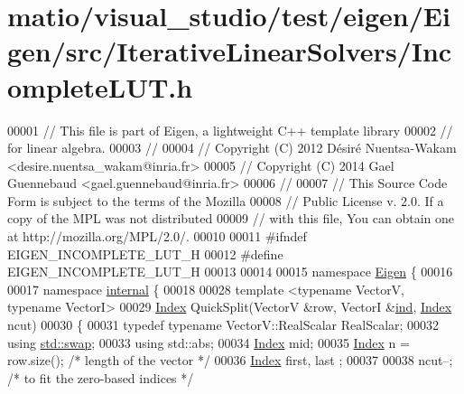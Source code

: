 \hypertarget{matio_2visual__studio_2test_2eigen_2_eigen_2src_2_iterative_linear_solvers_2_incomplete_l_u_t_8h_source}{}\section{matio/visual\+\_\+studio/test/eigen/\+Eigen/src/\+Iterative\+Linear\+Solvers/\+Incomplete\+L\+UT.h}
\label{matio_2visual__studio_2test_2eigen_2_eigen_2src_2_iterative_linear_solvers_2_incomplete_l_u_t_8h_source}

\begin{DoxyCode}
00001 \textcolor{comment}{// This file is part of Eigen, a lightweight C++ template library}
00002 \textcolor{comment}{// for linear algebra.}
00003 \textcolor{comment}{//}
00004 \textcolor{comment}{// Copyright (C) 2012 Désiré Nuentsa-Wakam <desire.nuentsa\_wakam@inria.fr>}
00005 \textcolor{comment}{// Copyright (C) 2014 Gael Guennebaud <gael.guennebaud@inria.fr>}
00006 \textcolor{comment}{//}
00007 \textcolor{comment}{// This Source Code Form is subject to the terms of the Mozilla}
00008 \textcolor{comment}{// Public License v. 2.0. If a copy of the MPL was not distributed}
00009 \textcolor{comment}{// with this file, You can obtain one at http://mozilla.org/MPL/2.0/.}
00010 
00011 \textcolor{preprocessor}{#ifndef EIGEN\_INCOMPLETE\_LUT\_H}
00012 \textcolor{preprocessor}{#define EIGEN\_INCOMPLETE\_LUT\_H}
00013 
00014 
00015 \textcolor{keyword}{namespace }\hyperlink{namespace_eigen}{Eigen} \{ 
00016 
00017 \textcolor{keyword}{namespace }\hyperlink{namespaceinternal}{internal} \{
00018     
00028 \textcolor{keyword}{template} <\textcolor{keyword}{typename} VectorV, \textcolor{keyword}{typename} VectorI>
00029 \hyperlink{namespace_eigen_a62e77e0933482dafde8fe197d9a2cfde}{Index} QuickSplit(VectorV &row, VectorI &\hyperlink{structind}{ind}, \hyperlink{namespace_eigen_a62e77e0933482dafde8fe197d9a2cfde}{Index} ncut)
00030 \{
00031   \textcolor{keyword}{typedef} \textcolor{keyword}{typename} VectorV::RealScalar RealScalar;
00032   \textcolor{keyword}{using} \hyperlink{endian_8c_a3ca5ecd34b04d6a243c054ac3a57f68d}{std::swap};
00033   \textcolor{keyword}{using} std::abs;
00034   \hyperlink{namespace_eigen_a62e77e0933482dafde8fe197d9a2cfde}{Index} mid;
00035   \hyperlink{namespace_eigen_a62e77e0933482dafde8fe197d9a2cfde}{Index} n = row.size(); \textcolor{comment}{/* length of the vector */}
00036   \hyperlink{namespace_eigen_a62e77e0933482dafde8fe197d9a2cfde}{Index} first, last ;
00037   
00038   ncut--; \textcolor{comment}{/* to fit the zero-based indices */}

\end{DoxyCode}
